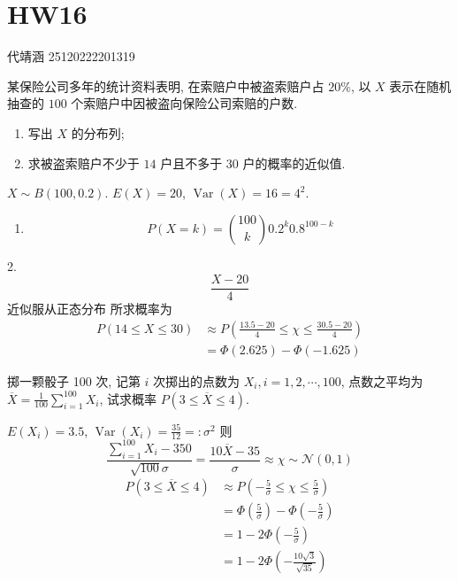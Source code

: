 \documentclass[../main.tex]{subfiles}
\begin{document}
\ifSubfilesClassLoaded{

    
    \setcounter{chapter}{15}
}{}

\chapter{ HW16 }
 代靖涵 25120222201319

\begin{exercise}{}{}
某保险公司多年的统计资料表明, 在索赔户中被盗索赔户占 $20\%$, 以 $X$ 表示在随机抽查的 $100$ 个索赔户中因被盗向保险公司索赔的户数.
\begin{enumerate}
    \item 写出 $X$ 的分布列;
    \item 求被盗索赔户不少于 $14$ 户且不多于 $30$ 户的概率的近似值.
\end{enumerate}
\end{exercise}
\begin{solution}
$X\sim B\left(100, 0.2\right)$. $E\left(X\right)= 20$, $\operatorname{Var}\left(X\right)= 16= 4^{2}$.
 \begin{enumerate}
     \item $$ P\left(X= k\right)= \binom{ 100 }{ k }0.2^{k}0.8^{100-k}   $$

 \end{enumerate}
2.
 $$ \frac{X-20 }{4 } $$
近似服从正态分布
所求概率为
 $$ \begin{aligned} P\left(14\le X\le 30\right)& \approx P\left(\frac{13.5-20 }{4 }\le \chi \le \frac{30.5-20 }{4 }\right)\\&= \Phi \left(2.625\right)-\Phi \left(-1.625\right)\end{aligned} $$
\end{solution}
\begin{exercise}{}{}
掷一颗骰子 100 次, 记第 $i$ 次掷出的点数为 $X_i, i=1,2,\cdots,100$, 点数之平均为 $\overline{X}=\frac{1}{100}\sum_{i=1}^{100}X_i$, 试求概率 $P(3\le\overline{X}\le4)$.
\end{exercise}
\begin{solution}
$E\left(X_{i}\right)= 3.5$, $\operatorname{Var}\left(X_{i}\right)=\frac{35 }{12 }= :\sigma ^{2}$
则
 $$ \frac{ \sum _{i= 1}^{100}X_{i}-350}{\sqrt{100}\sigma  } = \frac{10\overline{X}-35 }{\sigma  }\approx \chi \sim \mathcal{N}\left(0,1\right)$$
 $$ \begin{aligned} P\left(3\le \overline{X}\le 4\right)&\approx P\left(-\frac{5 }{\sigma  }\le \chi \le \frac{5 }{\sigma  }\right)\\&= \Phi \left(\frac{5 }{\sigma  }\right)-\Phi \left(-\frac{5 }{\sigma  }\right)\\&= 1-2\Phi \left(-\frac{5 }{ \sigma }\right)\\&= 1-2\Phi \left(-\frac{10\sqrt{3} }{\sqrt{35} }\right)  \end{aligned} $$
\end{solution}
\end{document}
